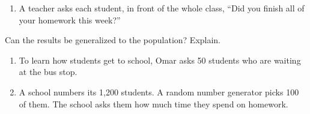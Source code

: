 \documentclass[11pt]{article}
\begin{document}
\begin{enumerate}
\begin{enumerate}
  \work{3em}
  \item A teacher asks each student, in front of the whole class, ``Did you finish all of your homework this week?''

  \work{3em}
\end{enumerate}

\vspace{0.4em}
Can the results be generalized to the population? Explain.
\begin{enumerate}[start=7]
  \item To learn how students get to school, Omar asks 50 students who are waiting at the bus stop.

  \work{3.5em}
  \item A school numbers its 1,200 students. A random number generator picks 100 of them. The school asks them how much time they spend on homework.

  \work{3.5em}
\end{enumerate}

\end{enumerate}
\end{document}

